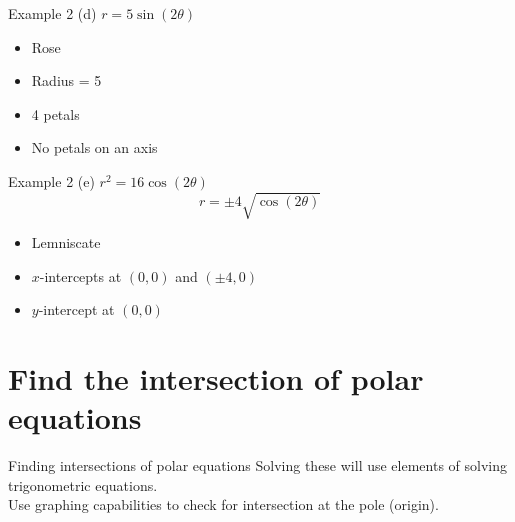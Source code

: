 \documentclass[t,usenames,dvipsnames]{beamer}
\begin{document}
\begin{frame}{Example 2}
(d) \quad $r = 5\sin(2\theta)$ \newline\\ \pause
\begin{itemize}
    \item Rose \newline\\ \pause
    \item Radius = 5 \newline\\ \pause
    \item 4 petals \newline\\  \pause
    \item No petals on an axis
\end{itemize}
\end{frame}

\begin{frame}{Example 2}
(e) \quad $r^2 = 16\cos(2\theta)$ \newline\\ \pause 
\[r = \pm 4\sqrt{\cos(2\theta)}\]   \pause
\begin{itemize}
    \item Lemniscate \newline\\ \pause
    \item $x$-intercepts at $(0,0)$ and $(\pm 4,0)$ \newline\\  \pause
    \item $y$-intercept at $(0,0)$
\end{itemize}
\end{frame}

\section{Find the intersection of polar equations}

\begin{frame}{Finding intersections of polar equations}
    Solving these will use elements of solving trigonometric equations. \newline\\    \pause
    Use graphing capabilities to check for intersection at the pole (origin).
\end{frame}
\end{document}
